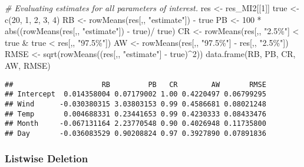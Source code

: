\documentclass[
]{article}
\newenvironment{Shaded}{\begin{snugshade}}{\end{snugshade}}
\newcommand{\CommentTok}[1]{\textcolor[rgb]{0.56,0.35,0.01}{\textit{#1}}}
\newcommand{\DecValTok}[1]{\textcolor[rgb]{0.00,0.00,0.81}{#1}}
\newcommand{\FunctionTok}[1]{\textcolor[rgb]{0.00,0.00,0.00}{#1}}
\newcommand{\NormalTok}[1]{#1}
\newcommand{\OtherTok}[1]{\textcolor[rgb]{0.56,0.35,0.01}{#1}}
\newcommand{\SpecialCharTok}[1]{\textcolor[rgb]{0.00,0.00,0.00}{#1}}
\newcommand{\StringTok}[1]{\textcolor[rgb]{0.31,0.60,0.02}{#1}}
\begin{document}
\begin{Shaded}
\begin{Highlighting}[]
\CommentTok{\# Evaluating estimates for all parameters of interest.}
\NormalTok{res }\OtherTok{\textless{}{-}}\NormalTok{ res\_MI2[[}\DecValTok{1}\NormalTok{]]}
\NormalTok{true }\OtherTok{\textless{}{-}} \FunctionTok{c}\NormalTok{(}\DecValTok{20}\NormalTok{, }\DecValTok{1}\NormalTok{, }\DecValTok{2}\NormalTok{, }\DecValTok{3}\NormalTok{, }\DecValTok{4}\NormalTok{)}
\NormalTok{RB }\OtherTok{\textless{}{-}} \FunctionTok{rowMeans}\NormalTok{(res[,, }\StringTok{"estimate"}\NormalTok{]) }\SpecialCharTok{{-}}\NormalTok{ true}
\NormalTok{PB }\OtherTok{\textless{}{-}} \DecValTok{100} \SpecialCharTok{*} \FunctionTok{abs}\NormalTok{((}\FunctionTok{rowMeans}\NormalTok{(res[,, }\StringTok{"estimate"}\NormalTok{]) }\SpecialCharTok{{-}}\NormalTok{ true)}\SpecialCharTok{/}\NormalTok{ true)}
\NormalTok{CR }\OtherTok{\textless{}{-}} \FunctionTok{rowMeans}\NormalTok{(res[,, }\StringTok{"2.5\%"}\NormalTok{] }\SpecialCharTok{\textless{}}\NormalTok{ true }\SpecialCharTok{\&}\NormalTok{ true }\SpecialCharTok{\textless{}}\NormalTok{ res[,, }\StringTok{"97.5\%"}\NormalTok{])}
\NormalTok{AW }\OtherTok{\textless{}{-}} \FunctionTok{rowMeans}\NormalTok{(res[,, }\StringTok{"97.5\%"}\NormalTok{] }\SpecialCharTok{{-}}\NormalTok{ res[,, }\StringTok{"2.5\%"}\NormalTok{])}
\NormalTok{RMSE }\OtherTok{\textless{}{-}} \FunctionTok{sqrt}\NormalTok{(}\FunctionTok{rowMeans}\NormalTok{((res[,, }\StringTok{"estimate"}\NormalTok{] }\SpecialCharTok{{-}}\NormalTok{ true)}\SpecialCharTok{\^{}}\DecValTok{2}\NormalTok{))}
\FunctionTok{data.frame}\NormalTok{(RB, PB, CR, AW, RMSE)}
\end{Highlighting}
\end{Shaded}

\begin{verbatim}
##                     RB         PB   CR        AW       RMSE
## Intercept  0.014358004 0.07179002 1.00 0.4220497 0.06799295
## Wind      -0.030380315 3.03803153 0.99 0.4586681 0.08021248
## Temp       0.004688331 0.23441653 0.99 0.4230333 0.08433476
## Month     -0.067131164 2.23770548 0.90 0.4026948 0.11735800
## Day       -0.036083529 0.90208824 0.97 0.3927890 0.07891836
\end{verbatim}

\hypertarget{listwise-deletion}{%
\subsubsection{Listwise Deletion}\label{listwise-deletion}}
\end{document}
